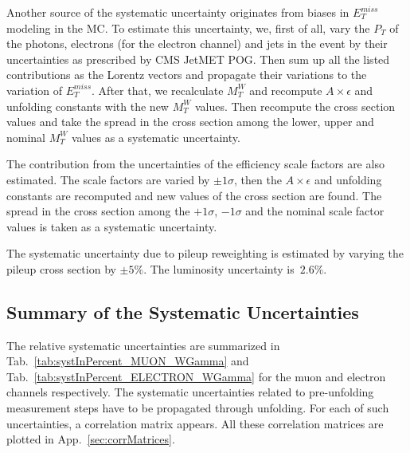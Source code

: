 
Another source of the systematic uncertainty originates from biases in $E_T^{miss}$ modeling in the MC. To estimate this uncertainty, we, first of all, vary the $P_T$ of the photons, electrons (for the electron channel) and jets in the event by their uncertainties as prescribed by CMS JetMET POG. Then sum up all the listed contributions as the Lorentz vectors and propagate their variations to the variation of $E_T^{miss}$. After that, we recalculate $M_T^{W}$ and recompute $A \times \epsilon$ and unfolding constants with the new $M_T^{W}$ values. Then recompute the cross section values and take the spread in the cross section among the lower, upper and nominal $M_T^{W}$ values as a systematic uncertainty.


The contribution from the uncertainties of the efficiency scale factors are also estimated. The scale factors are varied by $\pm 1\sigma$, then the $A \times \epsilon$ and unfolding constants are recomputed and new values of the cross section are found. The spread in the cross section among the $+1\sigma$, $-1\sigma$ and the nominal scale factor values is taken as a systematic uncertainty.



The systematic uncertainty due to pileup reweighting is estimated by varying the pileup cross section by $\pm5\%$. The luminosity uncertainty is~$2.6\%$.

\subsection{Summary of the Systematic Uncertainties}

The relative systematic uncertainties are summarized in Tab.~\ref{tab:systInPercent_MUON_WGamma} and Tab.~\ref{tab:systInPercent_ELECTRON_WGamma} for the muon and electron channels respectively. The systematic uncertainties related to pre-unfolding measurement steps have to be propagated through unfolding. For each of such uncertainties, a correlation matrix appears. All these correlation matrices are plotted in App.~\ref{sec:corrMatrices}.

